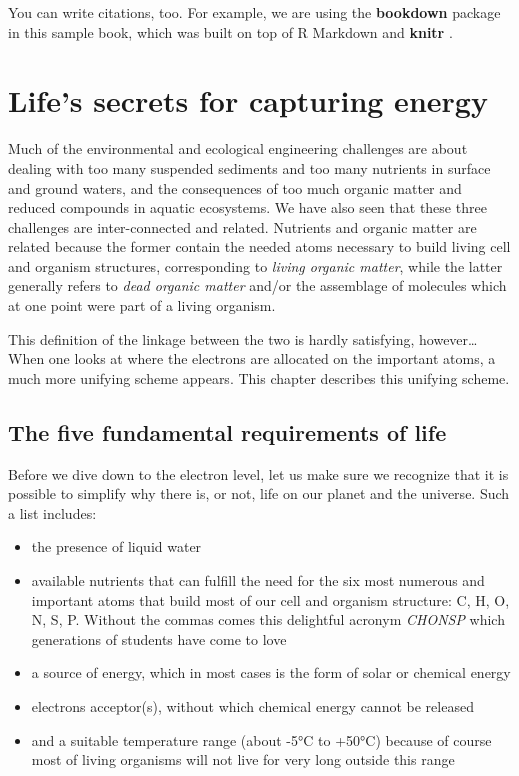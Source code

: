 \documentclass[]{book}
\providecommand{\tightlist}{%
  \setlength{\itemsep}{0pt}\setlength{\parskip}{0pt}}
\theoremstyle{definition}
\theoremstyle{definition}
\theoremstyle{definition}
\theoremstyle{remark}
\begin{document}
You can write citations, too. For example, we are using the
\textbf{bookdown} package \citep{R-bookdown} in this sample book, which
was built on top of R Markdown and \textbf{knitr} \citep{xie2015}.

\chapter{Life's secrets for capturing
energy}\label{lifes-secrets-for-capturing-energy}

Much of the environmental and ecological engineering challenges are
about dealing with too many suspended sediments and too many nutrients
in surface and ground waters, and the consequences of too much organic
matter and reduced compounds in aquatic ecosystems. We have also seen
that these three challenges are inter-connected and related. Nutrients
and organic matter are related because the former contain the needed
atoms necessary to build living cell and organism structures,
corresponding to \emph{living organic matter}, while the latter
generally refers to \emph{dead organic matter} and/or the assemblage of
molecules which at one point were part of a living organism.

This definition of the linkage between the two is hardly satisfying,
however\ldots{} When one looks at where the electrons are allocated on
the important atoms, a much more unifying scheme appears. This chapter
describes this unifying scheme.

\section{The five fundamental requirements of
life}\label{the-five-fundamental-requirements-of-life}

Before we dive down to the electron level, let us make sure we recognize
that it is possible to simplify why there is, or not, life on our planet
and the universe. Such a list includes:

\begin{itemize}
\tightlist
\item
  the presence of liquid water
\item
  available nutrients that can fulfill the need for the six most
  numerous and important atoms that build most of our cell and organism
  structure: C, H, O, N, S, P. Without the commas comes this delightful
  acronym \emph{CHONSP} which generations of students have come to love
\item
  a source of energy, which in most cases is the form of solar or
  chemical energy
\item
  electrons acceptor(s), without which chemical energy cannot be
  released
\item
  and a suitable temperature range (about -5°C to +50°C) because of
  course most of living organisms will not live for very long outside
  this range
\end{itemize}
\end{document}

